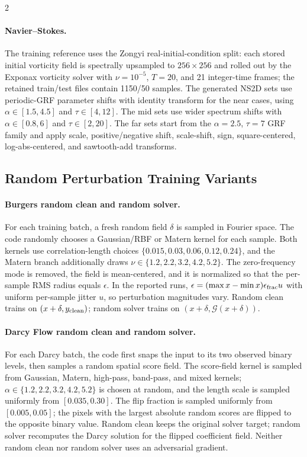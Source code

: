 \documentclass[letterpaper]{article} %
\begin{document}
\begin{multicols}{2}
\paragraph{Navier--Stokes.}
The training reference uses the Zongyi real-initial-condition split: each
stored initial vorticity field is spectrally upsampled to $256\times256$ and
rolled out by the Exponax vorticity solver with $\nu=10^{-5}$, $T=20$, and 21
integer-time frames; the retained train/test files contain 1150/50 samples.
The generated NS2D sets use periodic-GRF parameter shifts with identity
transform for the near cases, using $\alpha\in[1.5,4.5]$ and $\tau\in[4,12]$.  The mid sets use
wider spectrum shifts with $\alpha\in[0.8,6]$ and $\tau\in[2,20]$.  The far sets
start from the $\alpha=2.5$, $\tau=7$ GRF family and apply scale,
positive/negative shift, scale-shift, sign, square-centered, log-abs-centered,
and sawtooth-add transforms.

\columnbreak

\subsection*{Random Perturbation Training Variants}

\paragraph{Burgers random clean and random solver.}
For each training batch, a fresh random field $\delta$ is sampled in Fourier
space.  The code randomly chooses a Gaussian/RBF or Matern kernel for each
sample.  Both kernels use correlation-length choices
$\{0.015,0.03,0.06,0.12,0.24\}$, and the Matern branch additionally draws
$\nu\in\{1.2,2.2,3.2,4.2,5.2\}$.  The zero-frequency mode is removed, the field
is mean-centered, and it is normalized so that the per-sample RMS radius equals
$\epsilon$.  In the reported runs, $\epsilon=(\max x-\min x)\epsilon_{\rm frac}u$
with uniform per-sample jitter $u$, so perturbation magnitudes vary.  Random clean trains on
$(x+\delta,y_{\rm clean})$; random solver trains on
$(x+\delta,\mathcal G(x+\delta))$.

\paragraph{Darcy Flow random clean and random solver.}
For each Darcy batch, the code first snaps the input to its two observed binary
levels, then samples a random spatial score field.  The score-field kernel is
sampled from Gaussian, Matern, high-pass, band-pass, and mixed kernels;
$\alpha\in\{1.2,2.2,3.2,4.2,5.2\}$ is chosen at random, and the length scale is
sampled uniformly from $[0.035,0.30]$.  The flip fraction is sampled uniformly
from $[0.005,0.05]$; the pixels with the largest absolute random scores are
flipped to the opposite binary value.  Random clean keeps the original solver target;
random solver recomputes the Darcy solution for the flipped coefficient field.
Neither random clean nor random solver uses an adversarial gradient.


\end{multicols}
\end{document}
